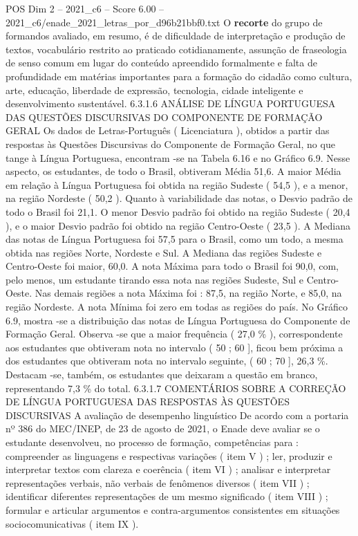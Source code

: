 \begin{textsample}{POS Dim 2 – 2021\_c6 – Score 6.00 – 2021\_c6/enade\_2021\_letras\_por\_d96b21bbf0.txt}
O \textbf{recorte} do grupo de formandos avaliado, em resumo, é de dificuldade de interpretação e produção de textos, vocabulário restrito ao praticado cotidianamente, assunção de fraseologia de senso comum em lugar do conteúdo apreendido formalmente e falta de profundidade em matérias importantes para a formação do cidadão como cultura, arte, educação, liberdade de expressão, tecnologia, cidade inteligente e desenvolvimento sustentável. 6.3.1.6 ANÁLISE DE LÍNGUA PORTUGUESA DAS QUESTÕES DISCURSIVAS DO COMPONENTE DE FORMAÇÃO GERAL Os dados de Letras-Português ( Licenciatura ), obtidos a partir das respostas às Questões Discursivas do Componente de Formação Geral, no que tange à Língua Portuguesa, encontram -se na Tabela 6.16 e no Gráfico 6.9.
Nesse aspecto, os estudantes, de todo o Brasil, obtiveram Média 51,6.
A maior Média em relação à Língua Portuguesa foi obtida na região Sudeste ( 54,5 ), e a menor, na região Nordeste ( 50,2 ).
Quanto à variabilidade das notas, o Desvio padrão de todo o Brasil foi 21,1.
O menor Desvio padrão foi obtido na região Sudeste ( 20,4 ), e o maior Desvio padrão foi obtido na região Centro-Oeste ( 23,5 ).
A Mediana das notas de Língua Portuguesa foi 57,5 para o Brasil, como um todo, a mesma obtida nas regiões Norte, Nordeste e Sul.
A Mediana das regiões Sudeste e Centro-Oeste foi maior, 60,0.
A nota Máxima para todo o Brasil foi 90,0, com, pelo menos, um estudante tirando essa nota nas regiões Sudeste, Sul e Centro-Oeste.
Nas demais regiões a nota Máxima foi : 87,5, na região Norte, e 85,0, na região Nordeste.
A nota Mínima foi zero em todas as regiões do país.
No Gráfico 6.9, mostra -se a distribuição das notas de Língua Portuguesa do Componente de Formação Geral.
Observa -se que a maior frequência ( 27,0 \% ), correspondente aos estudantes que obtiveram nota no intervalo ( 50 ; 60 ], ficou bem próxima a dos estudantes que obtiveram nota no intervalo seguinte, ( 60 ; 70 ], 26,3 \%.
Destacam -se, também, os estudantes que deixaram a questão em branco, representando 7,3 \% do total. 6.3.1.7 COMENTÁRIOS SOBRE A CORREÇÃO DE LÍNGUA PORTUGUESA DAS RESPOSTAS ÀS QUESTÕES DISCURSIVAS A avaliação de desempenho linguístico De acordo com a portaria nº 386 do MEC/INEP, de 23 de agosto de 2021, o Enade deve avaliar se o estudante desenvolveu, no processo de formação, competências para : compreender as linguagens e respectivas variações ( item V ) ; ler, produzir e interpretar textos com clareza e coerência ( item VI ) ; analisar e interpretar representações verbais, não verbais de fenômenos diversos ( item VII ) ; identificar diferentes representações de um mesmo significado ( item VIII ) ; formular e articular argumentos e contra-argumentos consistentes em situações sociocomunicativas ( item IX ).

\end{textsample}
